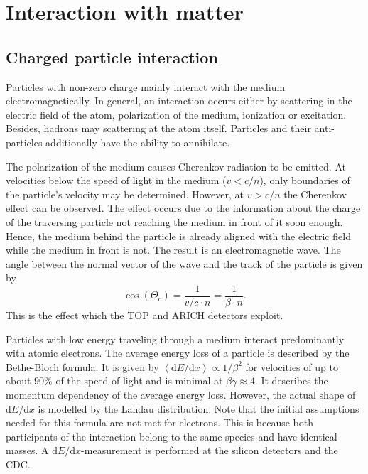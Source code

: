 \section{Interaction with matter}
\label{sec:interaction_with_matter}

\subsection{Charged particle interaction}
\label{sec:interaction_with_matter}

Particles with non-zero charge mainly interact with the medium electromagnetically. In general, an interaction occurs either by scattering in the electric field of the atom, polarization of the medium, ionization or excitation. Besides, hadrons may scattering at the atom itself. Particles and their anti-particles additionally have the ability to annihilate.

The polarization of the medium causes Cherenkov radiation to be emitted. At velocities below the speed of light in the medium ($v < c/n$), only boundaries of the particle's velocity may be determined. However, at $v > c/n$ the Cherenkov effect can be observed. The effect occurs due to the information about the charge of the traversing particle not reaching the medium in front of it soon enough. Hence, the medium behind the particle is already aligned with the electric field while the medium in front is not. The result is an electromagnetic wave. The angle between the normal vector of the wave and the track of the particle is given by
\begin{equation}
	\cos(\Theta_{c}) = \frac{1}{v/c \cdot n} = \frac{1}{\beta \cdot n}
	\mathrm{.}
\end{equation}
This is the effect which the TOP and ARICH detectors exploit.

Particles with low energy traveling through a medium interact predominantly with atomic electrons. The average energy loss of a particle is described by the Bethe-Bloch formula. It is given by $\left< \mathrm{d}E/\mathrm{d}x \right> \propto 1/{\beta^2}$ for velocities of up to about $90\%$ of the speed of light and is minimal at $\beta \gamma \approx 4$. It describes the momentum dependency of the average energy loss. However, the actual shape of $\mathrm{d}E/\mathrm{d}x$ is modelled by the Landau distribution. Note that the initial assumptions needed for this formula are not met for electrons. This is because both participants of the interaction belong to the same species and have identical masses.
A $\mathrm{d}E/\mathrm{d}x$-measurement is performed at the silicon detectors and the CDC.

